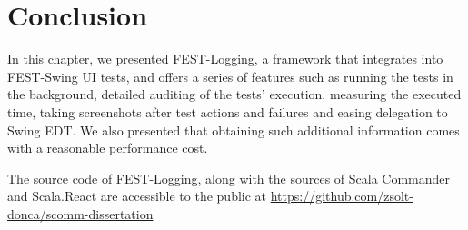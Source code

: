 \section{Conclusion}

In this chapter, we presented FEST-Logging, a framework that integrates into FEST-Swing UI tests, and offers a series of features such as running the tests in the background, detailed auditing of the tests' execution, measuring the executed time, taking screenshots after test actions and failures and easing delegation to Swing EDT. We also presented that obtaining such additional information comes with a reasonable performance cost.

The source code of FEST-Logging, along with the sources of Scala Commander and Scala.React are accessible to the public at \url{https://github.com/zsolt-donca/scomm-dissertation}








